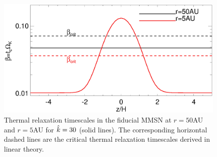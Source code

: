 \begin{figure}
  \includegraphics[width=\linewidth,clip=true,trim=0cm 0cm 0cm
  0cm]{figures/beta_compare}
  \caption{Thermal relaxation timescales in the fiducial MMSN at $r=50$AU
    and $r=5$AU for $\hat{k}=30$ (solid lines). The
    corresponding horizontal dashed lines are the critical thermal
    relaxation timescales derived in linear theory. 
    \label{beta_compare}}
\end{figure}


